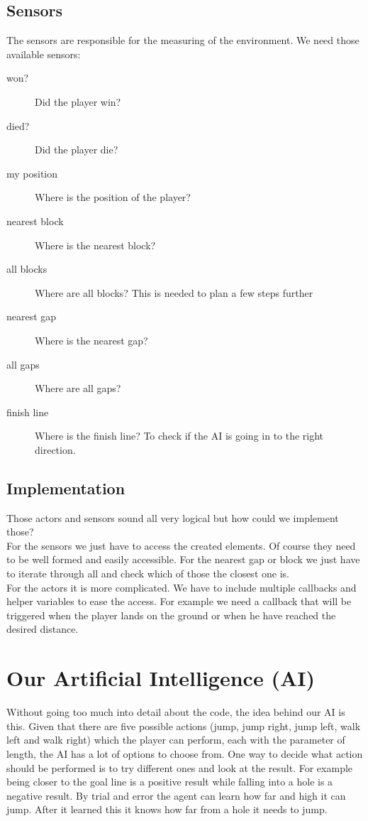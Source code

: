 \subsection{Sensors}
The sensors are responsible for the measuring of the environment. We need those available sensors:
\begin{description}
  \item[won?] Did the player win?
  \item[died?] Did the player die?
  \item[my position] Where is the position of the player?
  \item[nearest block] Where is the nearest block?
  \item[all blocks] Where are all blocks? This is needed to plan a few steps further
  \item[nearest gap] Where is the nearest gap?
  \item[all gaps] Where are all gaps?
  \item[finish line] Where is the finish line? To check if the AI is going in to the right direction.
\end{description}
\subsection{Implementation}
Those actors and sensors sound all very logical but how could we implement those?\medskip\\
For the sensors we just have to access the created elements. Of course they need to be well formed and easily accessible. For the nearest gap or block we just have to iterate through all and check which of those the closest one is.\medskip\\
For the actors it is more complicated. We have to include multiple callbacks and helper variables to ease the access. For example we need a callback that will be triggered when the player lands on the ground or when he have reached the desired distance.
\newpage
\section{Our Artificial Intelligence (AI)}

Without going too much into detail about the code, the idea behind our AI is this. Given that there are five possible actions (jump, jump right, jump left, walk left and walk right) which the player can perform, each with the parameter of length, the AI has a lot of options to choose from. One way to decide what action should be performed is to try different ones and look at the result. For example being closer to the goal line is a positive result while falling into a hole is a negative result. By trial and error the agent can learn how far and high it can jump. After it learned this it knows how far from a hole it needs to jump. 

